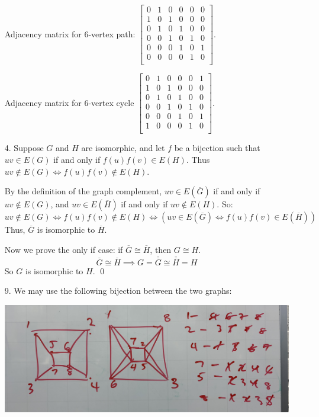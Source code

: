 \documentclass{article}
\begin{document}
\begin{enumerate}
		Adjacency matrix for 6-vertex path:
		$\displaystyle 
			\begin{bmatrix}
				0 & 1 & 0 & 0 & 0 & 0 \\
				1 & 0 & 1 & 0 & 0 & 0 \\
				0 & 1 & 0 & 1 & 0 & 0 \\
				0 & 0 & 1 & 0 & 1 & 0 \\
				0 & 0 & 0 & 1 & 0 & 1 \\
				0 & 0 & 0 & 0 & 1 & 0 \\
			\end{bmatrix}
		$.

		Adjacency matrix for 6-vertex cycle
		$\displaystyle 
			\begin{bmatrix}
				0 & 1 & 0 & 0 & 0 & 1 \\
				1 & 0 & 1 & 0 & 0 & 0 \\
				0 & 1 & 0 & 1 & 0 & 0 \\
				0 & 0 & 1 & 0 & 1 & 0 \\
				0 & 0 & 0 & 1 & 0 & 1 \\
				1 & 0 & 0 & 0 & 1 & 0 \\
			\end{bmatrix}
		$.

	\item[4.]
		Suppose $G$ and $H$ are isomorphic, and let $f$ be a bijection such that $uv\in E(G)$ if and only if $f(u)f(v)\in E(H)$. Thus $uv\not\in E(G) \iff f(u)f(v)\not\in E(H)$.

		By the definition of the graph complement, $uv\in E(\overline G)$ if and only if $uv\not\in E(G)$, and $uv\in E(\overline H)$ if and only if $uv\not\in E(H)$. So:
		\begin{equation*}
		    uv\not\in E(G)
			\iff f(u)f(v)\not\in E(H)
			\iff (uv\in E(\overline G)
			\iff f(u)f(v)\in E(\overline H))
		\end{equation*}
		Thus, $\overline G$ is isomorphic to $\overline H$.

		Now we prove the only if case: if $\overline G\cong \overline H$, then $G\cong H$.
		\begin{equation*}
			\overline G\cong \overline H
			\implies G=\overline{\overline G}\cong \overline{\overline H}=H
		\end{equation*}
		So $G$ is isomorphic to $H$.
		\qed

	\item[9.]
		We may use the following bijection between the two graphs:

		\begin{center}
			\includegraphics[width=0.8\linewidth]{IMG_3379.jpeg}
		\end{center}


\end{enumerate}
\end{document}
